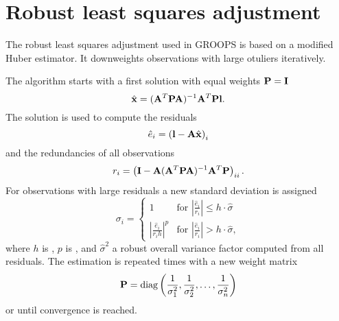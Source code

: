\section{Robust least squares adjustment}\label{fundamentals.robustLeastSquares}
The robust least squares adjustment used in GROOPS is based on a modified Huber
estimator. It downweights observations with large otuliers iteratively.

The algorithm starts with a first solution with equal weights $\mathbf{P} =\mathbf{I}$
\begin{equation}
  \hat{\mathbf{x}} = (\mathbf{A}^T\mathbf{P}\mathbf{A})^{-1}\mathbf{A}^T\mathbf{P}\mathbf{l}.
\end{equation}
The solution is used to compute the residuals
\begin{equation}
  \hat{e}_i = \left(\mathbf{l} - \mathbf{A} \hat{\mathbf{x}}\right)_i
\end{equation}
and the redundancies of all observations
\begin{equation}
  r_i = \left(\mathbf{I} - \mathbf{A}(\mathbf{A}^T\mathbf{P}\mathbf{A})^{-1}\mathbf{A}^T\mathbf{P}\right)_{ii}.
\end{equation}
For observations with large residuals a new standard deviation is assigned
\begin{equation}
  \sigma_i =
  \begin{cases}
    1                                     & \text{for } \left|\frac{\hat{e}_i}{r_i}\right| \le h\cdot\hat{\sigma} \\
    \left|\frac{\hat{e}_i}{r_ih}\right|^p & \text{for } \left|\frac{\hat{e}_i}{r_i}\right| > h\cdot\hat{\sigma},
  \end{cases}
\end{equation}
where $h$ is , $p$ is , and $\hat{\sigma}^2$ a robust overall variance factor
computed from all residuals.
The estimation is repeated  times with a new weight matrix
\begin{equation}
  \mathbf{P} = \text{diag}\left(\frac{1}{\sigma_1^2}, \frac{1}{\sigma_2^2}, \ldots, \frac{1}{\sigma_n^2}\right)
\end{equation}
 or until convergence is reached.
